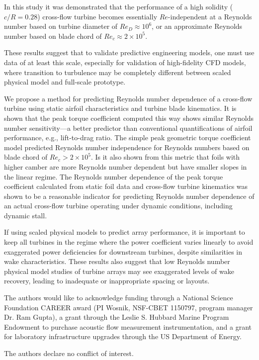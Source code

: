 \documentclass[energies,article,accept,moreauthors,pdftex,12pt,a4paper]{mdpi}
\begin{document}
In this study it was demonstrated that the performance of a high solidity
($c/R=0.28$) cross-flow turbine becomes essentially $Re$-independent at a
Reynolds number based on turbine diameter of $Re_D \approx 10^6$, or an
approximate Reynolds number based on blade chord of $Re_c \approx 2 \times
10^5$.


These results suggest that to validate predictive engineering models, one must
use data of at least this scale, especially for validation of high-fidelity CFD
models, where transition to turbulence may be completely different between
scaled physical model and full-scale prototype.

We propose a method for predicting Reynolds number dependence of a cross-flow
turbine using static airfoil characteristics and turbine blade kinematics. It is
shown that the peak torque coefficient computed this way shows similar Reynolds
number sensitivity---a better predictor than conventional quantifications of
airfoil performance, e.g., lift-to-drag ratio. The simple peak geometric torque
coefficient model predicted Reynolds number independence for Reynolds numbers
based on blade chord of $Re_c > 2 \times 10^5$. Is it also shown from this
metric that foils with higher camber are more Reynolds number dependent but have
smaller slopes in the linear regime. The Reynolds number dependence of the peak
torque coefficient calculated from static foil data and cross-flow turbine
kinematics was shown to be a reasonable indicator for predicting Reynolds number
dependence of an actual cross-flow turbine operating under dynamic conditions,
including dynamic stall.

If using scaled physical models to predict array performance, it is important to
keep all turbines in the regime where the power coefficient varies linearly to
avoid exaggerated power deficiencies for downstream turbines, despite
similarities in wake characteristics. These results also suggest that low
Reynolds number physical model studies of turbine arrays may see exaggerated
levels of wake recovery, leading to inadequate or inappropriate spacing or
layouts.



The authors would like to acknowledge funding through a National Science
Foundation CAREER award (PI Wosnik, NSF-CBET 1150797, program manager Dr. Ram
Gupta), a grant through the Leslie S. Hubbard Marine Program Endowment to
purchase acoustic flow measurement instrumentation, and a grant for laboratory
infrastructure upgrades through the US Department of Energy.


The authors declare no conflict of interest.




\end{document}
